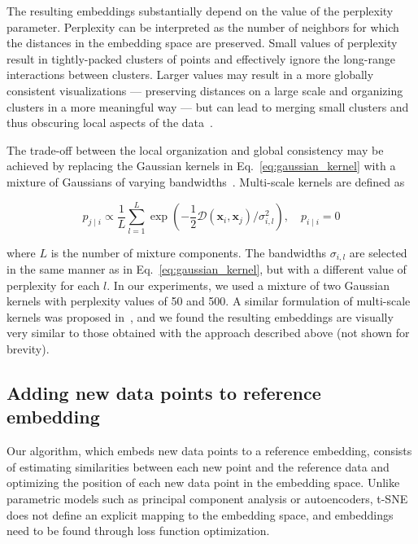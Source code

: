 \documentclass[runningheads]{llncs}
\begin{document}
The resulting embeddings substantially depend on the value of the perplexity
parameter. Perplexity can be interpreted as the number of neighbors for which
the distances in the embedding space are preserved. Small values of perplexity
result in tightly-packed clusters of points and effectively ignore the
long-range interactions between clusters. Larger values may result in a more
globally consistent visualizations --- preserving distances on a large scale
and organizing clusters in a more meaningful way --- but can lead to merging
small clusters and thus obscuring local aspects of the
data~\cite{art_of_using_tsne}.

The trade-off between the local organization and global consistency may be
achieved by replacing the Gaussian kernels in Eq.~\ref{eq:gaussian_kernel} with
a mixture of Gaussians of varying bandwidths~\cite{multiscale_tsne}.
Multi-scale kernels are defined as

\begin{equation}
p_{j \mid i} \propto \frac{1}{L} \sum_{l=1}^{L} \exp \left ( - \frac{1}{2} \mathcal{D}(\mathbf{x}_i, \mathbf{x}_j ) / \sigma_{i,l}^2 \right ), \quad p_{i \mid i} = 0
\label{eq:multiscale}
\end{equation}

\noindent where $L$ is the number of mixture components. The bandwidths
$\sigma_{i,l}$ are selected in the same manner as in
Eq.~\ref{eq:gaussian_kernel}, but with a different value of perplexity for each
$l$. In our experiments, we used a mixture of two Gaussian kernels with
perplexity values of 50 and 500. A similar formulation of
multi-scale kernels was proposed in~\cite{art_of_using_tsne}, and we found the
resulting embeddings are visually very similar to those obtained with the
approach described above (not shown for brevity).


\subsection{Adding new data points to reference embedding\label{sec:transfer}}

Our algorithm, which embeds new data points to a reference embedding, consists
of estimating similarities between each new point and the reference data and
optimizing the position of each new data point in the embedding space. Unlike
parametric models such as principal component analysis or autoencoders, t-SNE
does not define an explicit mapping to the embedding space, and embeddings need
to be found through loss function optimization.
\end{document}
